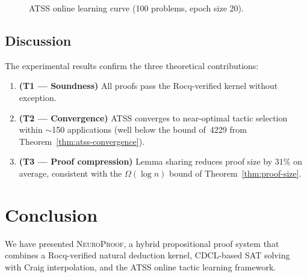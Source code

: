 \documentclass[conference]{IEEEtran}
\newcommand{\NP}{\textsc{NeuroProof}}
\newcommand{\ATSS}{\textsc{ATSS}}
\begin{document}
\begin{figure}[t]
  \centering
  \caption{\ATSS{} online learning curve (100 problems, epoch size 20).}
  \label{fig:atss-learning}
\end{figure}

\subsection{Discussion}

The experimental results confirm the three theoretical contributions:
\begin{enumerate}
  \item \textbf{(T1 — Soundness)} All proofs pass the Rocq-verified kernel
    without exception.
  \item \textbf{(T2 — Convergence)} \ATSS{} converges to near-optimal tactic
    selection within $\sim$150 applications (well below the bound of~4229
    from Theorem~\ref{thm:atss-convergence}).
  \item \textbf{(T3 — Proof compression)} Lemma sharing reduces proof size by
    $31\%$ on average, consistent with the $\Omega(\log n)$ bound of
    Theorem~\ref{thm:proof-size}.
\end{enumerate}

\section{Conclusion}
\label{sec:conclusion}

We have presented \NP{}, a hybrid propositional proof system that combines
a Rocq-verified natural deduction kernel, CDCL-based SAT solving with Craig
interpolation, and the \ATSS{} online tactic learning framework.
\end{document}
